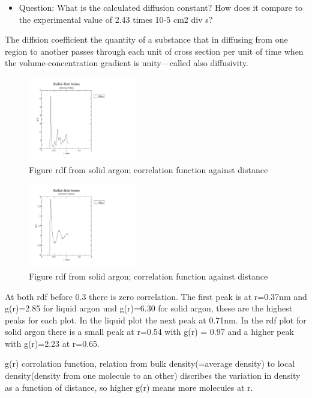 \documentclass[10pt, a4paper, oneside, twocolumn]{article}
\begin{document}
\begin{itemize}
	\item Question: What is the calculated diffusion constant? How does it compare to the experimental value of 2.43 times 10-5 cm2 div s?
\end{itemize}


The diffsion coefficient the quantity of a substance that in diffusing from one region to another passes through each unit of cross section per unit of time when the volume-concentration gradient is unity—called also diffusivity.       


\begin{figure}[t]
	\centering
	\includegraphics[width=180px]{plots/rdf_solid.png}
	\caption{Figure rdf from solid argon; correlation function against distance}
	\label{rdf solid}
\end{figure}

\begin{figure}[t]
	\centering
	\includegraphics[width=180px]{plots/rdf_liquid.png}
	\caption{Figure rdf from solid argon; correlation function against distance}
	\label{rdf liquid}
\end{figure}

At both rdf before 0.3 there is zero correlation. The first peak is at r=0.37nm and g(r)=2.85 for liquid argon und g(r)=6.30 for solid argon, these are the highest peaks for each plot. In the liquid plot the next peak at 0.71nm. In the rdf plot for solid argon there is a small peak at r=0.54 with g(r) = 0.97 and a higher peak with g(r)=2.23 at r=0.65.

g(r) corrolation function, relation from bulk density(=average density) to local density(density from one molecule to an other) discribes the variation in density as a function of distance, so higher g(r) means more molecules at r.
\end{document}
